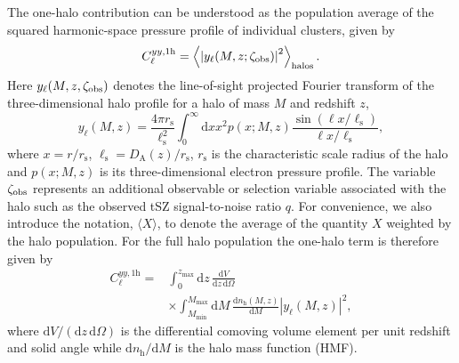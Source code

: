 \documentclass[aps,prd,twocolumn,superscriptaddress,nofootinbib,floatfix]{revtex4-2}
\begin{document}
The one-halo contribution can be understood as the population average of the squared harmonic-space pressure profile of individual clusters, given by
\begin{equation}
C_{\ell}^{yy,\mathrm{1h}}
=
\left\langle
\left|
y_{\ell}(M,z;\zeta_{\rm obs})
\right|^2
\right\rangle_{\mathrm{halos}}.
\label{eq:1haloavg}
\end{equation}
Here $y_{\ell}(M,z,\zeta_{\rm obs})$ denotes the line-of-sight projected Fourier transform of the three-dimensional halo profile for a halo of mass $M$ and redshift $z$,
\begin{equation}
y_{\ell}(M,z)
=
\frac{4\pi r_{\mathrm{s}}}{\ell_{\mathrm{s}}^2}
\int_{0}^{\infty}
\mathrm{d}x
x^2 p(x;M,z)
\frac{\sin\left(\ell x/\ell_{\mathrm{s}}\right)}
{\ell x/\ell_{\mathrm{s}}},
\label{eq:projected_pressure_transform}
\end{equation}
where $x=r/r_{\mathrm{s}}$, $\ell_{\mathrm{s}}=D_{\mathrm{A}}(z)/r_{\mathrm{s}}$, $r_{\mathrm{s}}$ is the characteristic scale radius of the halo and $p(x;M,z)$ is its three-dimensional electron pressure profile. The variable $\zeta_{\rm obs}$ represents an additional observable or selection variable associated with the halo such as the observed tSZ signal-to-noise ratio $q$. For convenience, we also introduce the notation, $\langle X \rangle$, to denote the average of the quantity $X$ weighted by the halo population. For the full halo population the one-halo term is
therefore given by
\begin{align}
C_{\ell}^{yy,\mathrm{1h}}
={}&
\int_{0}^{z_{\mathrm{max}}}
\mathrm{d}z\,
\frac{\mathrm{d}V}
{\mathrm{d}z\,\mathrm{d}\Omega}
\nonumber\\
&\times
\int_{M_{\mathrm{min}}}^{M_{\mathrm{max}}}
\mathrm{d}M\,
\frac{\mathrm{d}n_{\mathrm{h}}(M,z)}
{\mathrm{d}M}
\left|
y_{\ell}(M,z)
\right|^2,
\label{eq:tsz_one_halo_full}
\end{align}
where $\mathrm{d}V/(\mathrm{d}z\,\mathrm{d}\Omega)$ is the differential
comoving volume element per unit redshift and solid angle while
$\mathrm{d}n_{\mathrm{h}}/\mathrm{d}M$ is the halo mass function (HMF).
\end{document}
